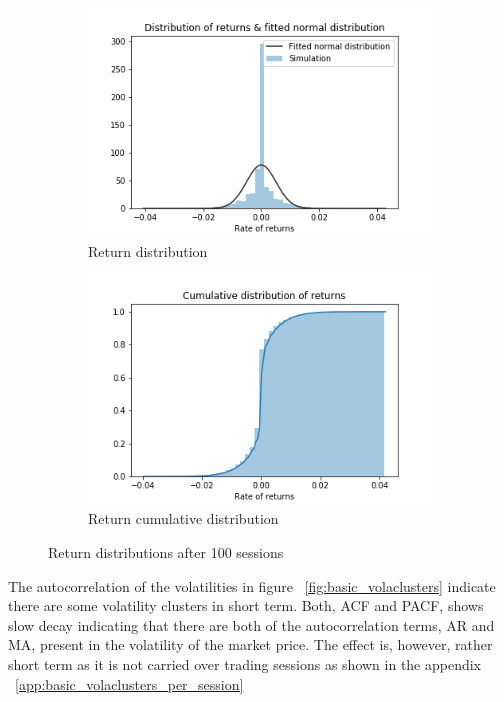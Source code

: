 \begin{figure}
    \centering
    \begin{subfigure}{.5\textwidth}
      \centering
      \includegraphics[width=\linewidth]{plots/basic_fat_tails.png}
      \caption{Return distribution}
      \label{fig:basic_return_fitdistr}
    \end{subfigure}%
    \begin{subfigure}{.5\textwidth}
      \centering
      \includegraphics[width=\linewidth]{plots/basic_fat_tails_cumdist.png}
      \caption{Return cumulative distribution}
      \label{fig:basic_return_cumdistr}
    \end{subfigure}
    \caption{Return distributions after 100 sessions}
    \label{fig:basic_return_distr}
\end{figure}


The autocorrelation of the volatilities in figure ~\ref{fig:basic_volaclusters}
indicate there are some volatility clusters in short term. Both, ACF and PACF, shows slow
decay indicating that there are both of the autocorrelation terms, AR and MA,
present in the volatility of the market price. The effect is, however, rather short term
as it is not carried over trading sessions as shown in the appendix ~\ref{app:basic_volaclusters_per_session}


